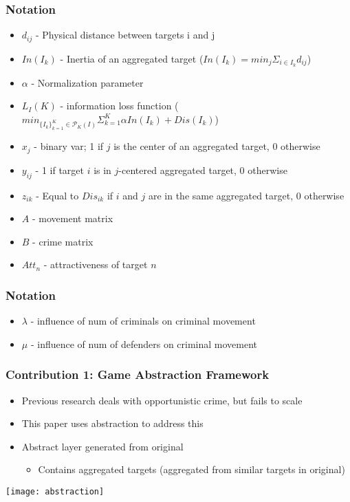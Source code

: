 \documentclass{beamer}
\begin{document}
	\begin{frame}
		\frametitle{Notation}
		\begin{itemize}
			\item $ d_{ij} $ - Physical distance between targets i and j \\
			\item $ In(I_{k}) $ - Inertia of an aggregated target ($In(I_{k}) = min_{j}\Sigma_{i\in I_{k}}d_{ij}$) \\
			\item $ \alpha $ - Normalization parameter \\
			\item $ L_{I}(K) $ - information loss function ($min_{\{I_{k}\}^{K}_{k=1}\in \mathcal{P}_{K}(I)}\Sigma^{K}_{k=1} \alpha In(I_{k}) + Dis(I_{k}) $) \\
			\item $ x_{j} $ - binary var; 1 if $j$ is the center of an aggregated target, 0 otherwise \\
			\item $ y_{ij} $ - 1 if target $i$ is in $j$-centered aggregated target, 0 otherwise \\
			\item $ z_{ik} $ - Equal to $Dis_{ik}$ if $i$ and $j$ are in the same aggregated target, 0 otherwise \\
			\item $ A $ - movement matrix \\
			\item $ B $ - crime matrix \\
			\item $ Att_{n} $ - attractiveness of target $n$
		\end{itemize}
	\end{frame}

	\begin{frame}
		\frametitle{Notation}
		\begin{itemize}
			\item $ \lambda $ - influence of num of criminals on criminal movement \\
			\item $ \mu $ - influence of num of defenders on criminal movement \\
		\end{itemize}
	\end{frame}

	\begin{frame}
		\frametitle{Contribution 1: Game Abstraction Framework}
		\begin{itemize}
			\item Previous research deals with opportunistic crime, but fails to scale
			\item This paper uses abstraction to address this
			\item Abstract layer generated from original 
				\begin{itemize}
					\item Contains aggregated targets (aggregated from similar targets in original)
				\end{itemize}
		\end{itemize}
		\texttt{[image: abstraction]}
	\end{frame}
\end{document}
